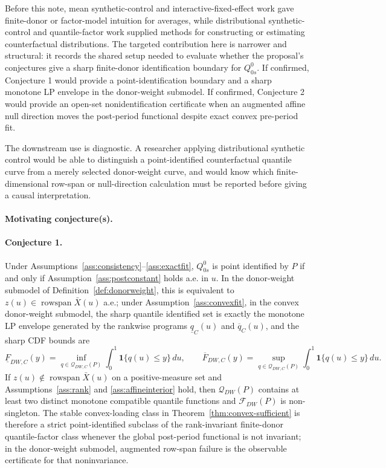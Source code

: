 \documentclass[11pt]{article}
\newcommand{\one}{\mathbf{1}}
\theoremstyle{definition}
\theoremstyle{plain}
\theoremstyle{remark}
\begin{document}
Before this note, mean synthetic-control and interactive-fixed-effect work gave finite-donor or factor-model intuition for averages, while distributional synthetic-control and quantile-factor work supplied methods for constructing or estimating counterfactual distributions.  The targeted contribution here is narrower and structural: it records the shared setup needed to evaluate whether the proposal's conjectures give a sharp finite-donor identification boundary for \(Q^0_{0s}\).  If confirmed, Conjecture 1 would provide a point-identification boundary and a sharp monotone LP envelope in the donor-weight submodel.  If confirmed, Conjecture 2 would provide an open-set nonidentification certificate when an augmented affine null direction moves the post-period functional despite exact convex pre-period fit.

The downstream use is diagnostic.  A researcher applying distributional synthetic control would be able to distinguish a point-identified counterfactual quantile curve from a merely selected donor-weight curve, and would know which finite-dimensional row-span or null-direction calculation must be reported before giving a causal interpretation.

\paragraph{Motivating conjecture(s).}
\paragraph{Conjecture 1.}\label{conj:point-boundary}
Under Assumptions~\ref{ass:consistency}--\ref{ass:exactfit}, \(Q^0_{0s}\) is point identified by \(P\) if and only if Assumption~\ref{ass:postconstant} holds a.e. in \(u\).  In the donor-weight submodel of Definition~\ref{def:donorweight}, this is equivalent to \(z(u)\in\operatorname{rowspan}\bar X(u)\) a.e.; under Assumption~\ref{ass:convexfit}, in the convex donor-weight submodel, the sharp quantile identified set is exactly the monotone LP envelope generated by the rankwise programs \(\underline q_C(u)\) and \(\overline q_C(u)\), and the sharp CDF bounds are
\[
\underline F_{DW,C}(y)=\inf_{q\in\mathcal{Q}_{DW,C}(P)}\int_0^1\one\{q(u)\le y\}\,du,\qquad
\overline F_{DW,C}(y)=\sup_{q\in\mathcal{Q}_{DW,C}(P)}\int_0^1\one\{q(u)\le y\}\,du.
\]
If \(z(u)\notin\operatorname{rowspan}\bar X(u)\) on a positive-measure set and Assumptions~\ref{ass:rank} and \ref{ass:affineinterior} hold, then \(\mathcal{Q}_{DW}(P)\) contains at least two distinct monotone compatible quantile functions and \(\mathcal{F}_{DW}(P)\) is non-singleton.  The stable convex-loading class in Theorem~\ref{thm:convex-sufficient} is therefore a strict point-identified subclass of the rank-invariant finite-donor quantile-factor class whenever the global post-period functional is not invariant; in the donor-weight submodel, augmented row-span failure is the observable certificate for that noninvariance.
\end{document}
